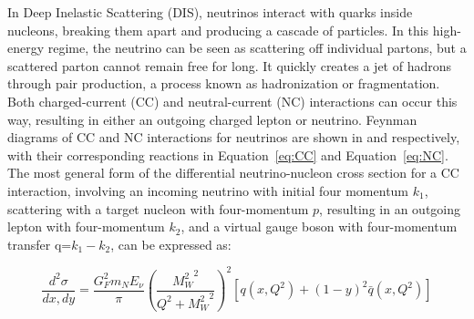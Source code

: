 In Deep Inelastic Scattering (DIS), neutrinos interact with quarks inside nucleons, breaking them apart and producing a cascade of particles. In this high-energy regime, the neutrino can be seen as scattering off individual partons, but a scattered parton cannot remain free for long. It quickly creates a jet of hadrons through pair production, a process known as hadronization or fragmentation. Both charged-current (CC) and neutral-current (NC) interactions can occur this way, resulting in either an outgoing charged lepton or neutrino. Feynman diagrams of CC and NC interactions for neutrinos are shown in  and  respectively, with their corresponding reactions in Equation~\ref{eq:CC} and Equation~\ref{eq:NC}. The most general form of the differential neutrino-nucleon cross section for a CC interaction, involving an incoming neutrino with initial four momentum $k_1$, scattering with a target nucleon with four-momentum $p$, resulting in an outgoing lepton with four-momentum $k_2$, and a virtual gauge boson with four-momentum transfer q=$k_1-k_2$, can be expressed as:

\begin{equation}\label{eq:DIS_xsec_formula}
        \frac{d^2\sigma}{dx,dy} = \frac{G_F^2m_N E_\nu}{\pi} \left(\frac{{M_W^2}^2}{{Q^2}+{M_W^2}^2}\right)^2 \left[ q(x,Q^2) + (1-y)^2 \bar{q}(x,Q^2) \right] 
\end{equation}


